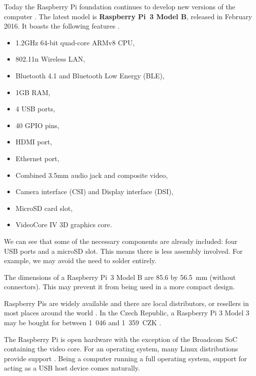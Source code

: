             Today the Raspberry Pi foundation continues to develop new versions of the computer \cite{rpi-products}.  The latest model is \textbf{Raspberry Pi~3 Model B}, released in February 2016.  It boasts the following features \cite{rpi-3}.
            
            \begin{itemize}
                \item 1.2GHz 64-bit quad-core ARMv8 CPU,
                \item 802.11n Wireless LAN,
                \item Bluetooth 4.1 and Bluetooth Low Energy (BLE),
                \item 1GB RAM,
                \item 4 USB ports,
                \item 40 GPIO pins,
                \item HDMI port,
                \item Ethernet port,
                \item Combined 3.5mm audio jack and composite video,
                \item Camera interface (CSI) and Display interface (DSI),
                \item MicroSD card slot,
                \item VideoCore IV 3D graphics core.
            \end{itemize}
            
            We can see that some of the necessary components are already included: four USB ports and a microSD slot.  This means there is less assembly involved.  For example, we may avoid the need to solder entirely.
            
            The dimensions of a Raspberry Pi~3 Model B are 85.6 by 56.5~mm (without connectors).  This may prevent it from being used in a more compact design.
            
            Raspberry Pis are widely available and there are local distributors, or resellers in most places around the world \cite{rpi-buying-guide} \cite{rpi-buying-links-by-country}.  In the Czech Republic, a Raspberry Pi 3 Model 3 may be bought for between 1~046 and 1~359~CZK \cite{rpi-rpi3-rpishop} \cite{rpi-rpi3-minidroid} \cite{rpi-rpi3-alza}.
            
            The Raspberry Pi is open hardware with the exception of the Broadcom SoC containing the video core.  For an operating system, many Linux distributions provide support \cite{rpi-opensource}.  Being a computer running a full operating system, support for acting as a USB host device comes naturally.
            
